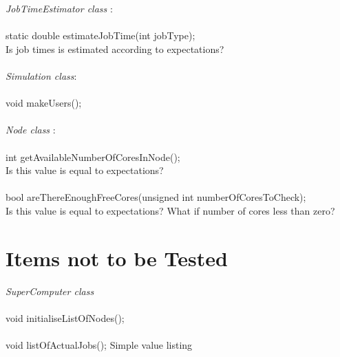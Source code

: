 \documentclass{scrreprt}
\begin{document}
\textit{
JobTimeEstimator class} :
\\
\\
static double estimateJobTime(int jobType);\\
Is job times is estimated according to expectations?
  \\
 \\


\textit{Simulation class}:  
\\
\\
 void makeUsers();
 \\
 \\
 \textit{
Node class} :  
 \\
 \\
 int getAvailableNumberOfCoresInNode();\\
 Is this value is equal to expectations?
\\
\\
bool areThereEnoughFreeCores(unsigned int numberOfCoresToCheck);\\
Is this value is equal to expectations? What if number of cores less than zero?





\section{Items 
not to be Tested}



\textit{SuperComputer class}
\\
\\
void initialiseListOfNodes();
\\
\\
void listOfActualJobs();
Simple value listing
\\
\\
\end{document}
